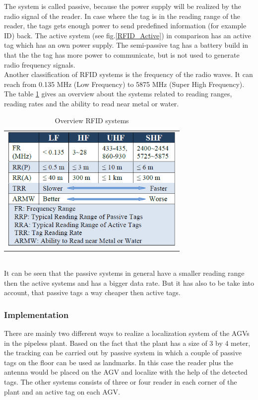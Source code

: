 The system is called passive, because the power supply will be realized by the radio signal of the reader. In case where the tag is in the reading range of the reader, the tags gets enough power to send predefined information (for example ID) back. The active system (see fig.\ref{RFID_Active}) in comparison has an active tag which has an own power supply. The semi-passive tag has a battery build in that the the tag has more power to communicate, but is not used to generate radio frequency signals.\\ 
Another classification of RFID systems is the frequency of the radio waves. It can reach from 0.135 MHz (Low Frequency) to 5875 MHz (Super High Frequency). The table \ref{RFID_Systems} gives an overview about the systems related to reading ranges, reading rates and the ability to read near metal or water.\\
\begin{table}[!htbp]
\centering
\begin{tabular}{c}
\includegraphics[width = 9cm]{Pictures/RFID_Systems}
\end{tabular}
\caption{Overview RFID systems}
\label{RFID_Systems}
\end{table}\\
It can be seen that the passive systems in general have a smaller reading range then the active systems and has a bigger data rate. But it has also to be take into account, that passive tags a way cheaper then active tags.   
\subsubsection*{Implementation}
There are mainly two different ways to realize a localization system of the AGVs in the pipeless plant. Based on the fact that the plant has a size of 3 by 4 meter, the tracking can be carried out by passive system in which a couple of passive tags on the floor can be used as landmarks. In this case the reader plus the antenna would be placed on the AGV and localize with the help of the detected tags. The other systems consists of three or four reader in each corner of the plant and an active tag on each AGV. 

